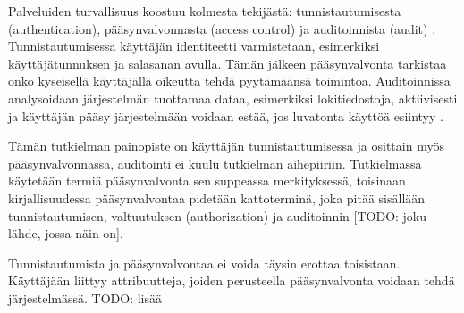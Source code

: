 Palveluiden turvallisuus koostuu kolmesta tekijästä: tunnistautumisesta (authentication), pääsynvalvonnasta (access control) ja auditoinnista (audit) \cite{sandhu}. Tunnistautumisessa käyttäjän identiteetti varmistetaan, esimerkiksi käyttäjätunnuksen ja salasanan avulla. Tämän jälkeen pääsynvalvonta tarkistaa onko kyseisellä käyttäjällä oikeutta tehdä pyytämäänsä toimintoa. Auditoinnissa analysoidaan järjestelmän tuottamaa dataa, esimerkiksi lokitiedostoja, aktiivisesti ja käyttäjän pääsy järjestelmään voidaan estää, jos luvatonta käyttöä esiintyy \cite{sandhu}.

Tämän tutkielman painopiste on käyttäjän tunnistautumisessa ja osittain myös pääsynvalvonnassa, auditointi ei kuulu tutkielman aihepiiriin. Tutkielmassa käytetään termiä pääsynvalvonta sen suppeassa merkityksessä, toisinaan kirjallisuudessa pääsynvalvontaa pidetään kattoterminä, joka pitää sisällään tunnistautumisen, valtuutuksen (authorization) ja auditoinnin [TODO: joku lähde, jossa näin on].

Tunnistautumista ja pääsynvalvontaa ei voida täysin erottaa toisistaan. Käyttäjään liittyy attribuutteja, joiden perusteella pääsynvalvonta voidaan tehdä järjestelmässä. TODO: lisää